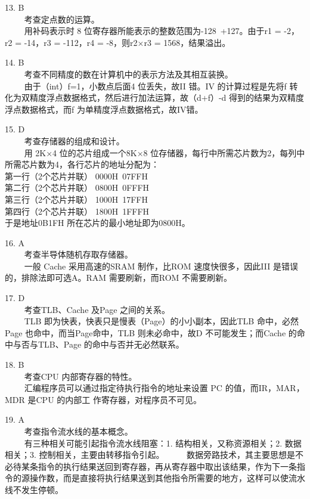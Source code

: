 13. B \\
$\qquad$ 考查定点数的运算。\\
$\qquad$ 用补码表示时 8 位寄存器所能表示的整数范围为-128~+127。由于r1 = -2，r2 = -14，r3 = -112，r4 = -8，则r2×r3 = 1568，结果溢出。

14. B \\
$\qquad$ 考查不同精度的数在计算机中的表示方法及其相互装换。\\
$\qquad$ 由于（int）f=1，小数点后面4 位丢失，故II 错。IV 的计算过程是先将f 转化为双精度浮点数据格式，然后进行加法运算，故（d+f）-d 得到的结果为双精度浮点数据格式，而f 为单精度浮点数据格式，故IV错。

15. D \\
$\qquad$ 考查存储器的组成和设计。\\
$\qquad$ 用 2K×4 位的芯片组成一个8K×8 位存储器，每行中所需芯片数为2，每列中所需芯片数为4，各行芯片的地址分配为：\\
第一行（2个芯片并联） 0000H~07FFH \\
第二行（2个芯片并联） 0800H~0FFFH \\
第三行（2个芯片并联） 1000H~17FFH \\
第四行（2个芯片并联） 1800H~1FFFH \\
于是地址0B1FH 所在芯片的最小地址即为0800H。

16. A \\
$\qquad$ 考查半导体随机存取存储器。\\
$\qquad$ 一般 Cache 采用高速的SRAM 制作，比ROM 速度快很多，因此III 是错误的，排除法即可选A。RAM 需要刷新，而ROM 不需要刷新。

17. D \\
$\qquad$ 考查TLB、Cache 及Page 之间的关系。\\
$\qquad$ TLB 即为快表，快表只是慢表（Page）的小小副本，因此TLB 命中，必然Page 也命中，而当Page命中，TLB 则未必命中，故D 不可能发生；而Cache 的命中与否与TLB、Page 的命中与否并无必然联系。

18. B \\
$\qquad$ 考查CPU 内部寄存器的特性。\\
$\qquad$ 汇编程序员可以通过指定待执行指令的地址来设置 PC 的值，而IR，MAR，MDR 是CPU 的内部工
作寄存器，对程序员不可见。

19. A \\
$\qquad$ 考查指令流水线的基本概念。\\
$\qquad$ 有三种相关可能引起指令流水线阻塞：1. 结构相关，又称资源相关；2. 数据相关；3. 控制相关，主要由转移指令引起。
$\qquad$ 数据旁路技术，其主要思想是不必待某条指令的执行结果送回到寄存器，再从寄存器中取出该结果，作为下一条指令的源操作数，而是直接将执行结果送到其他指令所需要的地方，这样可以使流水线不发生停顿。

